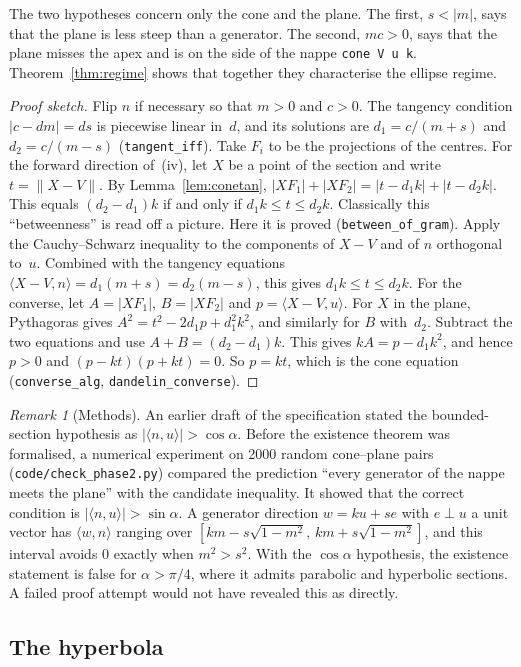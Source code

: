 \documentclass[11pt]{article}
\theoremstyle{remark}
\newtheorem{remark}[theorem]{Remark}
\newcommand{\lean}[1]{\texttt{#1}}
\newcommand{\ip}[2]{\langle #1,#2\rangle}
\newcommand{\nm}[1]{\lVert #1\rVert}
\begin{document}
The two hypotheses concern only the cone and the plane. The first, $s<|m|$, says that the plane
is less steep than a generator. The second, $mc>0$, says that the plane misses the apex and is
on the side of the nappe \lean{cone V u k}. Theorem~\ref{thm:regime} shows that together they
characterise the ellipse regime.

\begin{proof}[Proof sketch]
Flip $n$ if necessary so that $m>0$ and $c>0$. The tangency condition $|c-dm|=ds$ is piecewise linear
in~$d$, and its solutions are $d_1=c/(m+s)$ and $d_2=c/(m-s)$ (\lean{tangent\_iff}). Take
$F_i$ to be the projections of the centres. For the forward direction of~(iv), let $X$ be a point
of the section and write $t=\nm{X-V}$. By Lemma~\ref{lem:conetan}, $|XF_1|+|XF_2|=|t-d_1k|+|t-d_2k|$.
This equals $(d_2-d_1)k$ if and only if $d_1k\le t\le d_2k$. Classically this ``betweenness'' is read off a
picture. Here it is proved (\lean{between\_of\_gram}). Apply the Cauchy--Schwarz inequality to the
components of $X-V$ and of $n$ orthogonal to~$u$. Combined with the tangency equations
$\ip{X-V}n=d_1(m+s)=d_2(m-s)$, this gives $d_1k\le t\le d_2k$.
For the converse, let $A=|XF_1|$, $B=|XF_2|$ and $p=\ip{X-V}u$. For $X$ in the plane,
Pythagoras gives $A^2=t^2-2d_1p+d_1^2k^2$, and similarly for $B$ with~$d_2$. Subtract the two
equations and use $A+B=(d_2-d_1)k$. This gives $kA=p-d_1k^2$, and hence $p>0$ and
$(p-kt)(p+kt)=0$. So $p=kt$, which is the cone equation (\lean{converse\_alg},
\lean{dandelin\_converse}).
\end{proof}

\begin{remark}[Methods]\label{rem:cos}
An earlier draft of the specification stated the bounded-section hypothesis as
$|\ip nu|>\cos\alpha$. Before the existence theorem was formalised, a numerical experiment on 2000 random
cone--plane pairs (\texttt{code/check\_phase2.py}) compared the prediction ``every generator of
the nappe meets the plane'' with the candidate inequality. It showed that the correct condition is
$|\ip nu|>\sin\alpha$. A generator direction $w=ku+se$ with $e\perp u$ a unit vector has
$\ip wn$ ranging over $[km-s\sqrt{1-m^2},\,km+s\sqrt{1-m^2}]$, and this interval avoids $0$
exactly when $m^2>s^2$. With the $\cos\alpha$ hypothesis, the existence statement is false for
$\alpha>\pi/4$, where it admits parabolic and hyperbolic sections. A failed proof attempt would
not have revealed this as directly.
\end{remark}

\subsection{The hyperbola}
\end{document}
